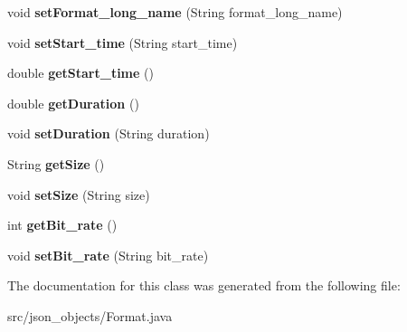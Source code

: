 \begin{DoxyCompactItemize}
\item 
\hypertarget{classjson__objects_1_1_format_a095cd9ab11d564f9b08e7149157a820b}{
void {\bfseries setFormat\_\-long\_\-name} (String format\_\-long\_\-name)}
\label{classjson__objects_1_1_format_a095cd9ab11d564f9b08e7149157a820b}

\item 
\hypertarget{classjson__objects_1_1_format_af24b560392f4351d85346dc5b7557d83}{
void {\bfseries setStart\_\-time} (String start\_\-time)}
\label{classjson__objects_1_1_format_af24b560392f4351d85346dc5b7557d83}

\item 
\hypertarget{classjson__objects_1_1_format_ae08d60b4b16aac2f463e31abcef29ddc}{
double {\bfseries getStart\_\-time} ()}
\label{classjson__objects_1_1_format_ae08d60b4b16aac2f463e31abcef29ddc}

\item 
\hypertarget{classjson__objects_1_1_format_a495f8cd367fadd1fef929909b924ae5a}{
double {\bfseries getDuration} ()}
\label{classjson__objects_1_1_format_a495f8cd367fadd1fef929909b924ae5a}

\item 
\hypertarget{classjson__objects_1_1_format_a49419de68425d77fe0b2b4b1143ede89}{
void {\bfseries setDuration} (String duration)}
\label{classjson__objects_1_1_format_a49419de68425d77fe0b2b4b1143ede89}

\item 
\hypertarget{classjson__objects_1_1_format_a760f557c3fd5bd658fc8f45a75f73bd2}{
String {\bfseries getSize} ()}
\label{classjson__objects_1_1_format_a760f557c3fd5bd658fc8f45a75f73bd2}

\item 
\hypertarget{classjson__objects_1_1_format_a5e5921e5d401aff6fa59141ab95a87cb}{
void {\bfseries setSize} (String size)}
\label{classjson__objects_1_1_format_a5e5921e5d401aff6fa59141ab95a87cb}

\item 
\hypertarget{classjson__objects_1_1_format_a8b1362f276e684b33f0753eab8c9f0f3}{
int {\bfseries getBit\_\-rate} ()}
\label{classjson__objects_1_1_format_a8b1362f276e684b33f0753eab8c9f0f3}

\item 
\hypertarget{classjson__objects_1_1_format_a11b67ad9552afa3d09953cb5fba80439}{
void {\bfseries setBit\_\-rate} (String bit\_\-rate)}
\label{classjson__objects_1_1_format_a11b67ad9552afa3d09953cb5fba80439}

\end{DoxyCompactItemize}


The documentation for this class was generated from the following file:\begin{DoxyCompactItemize}
\item 
src/json\_\-objects/Format.java\end{DoxyCompactItemize}
